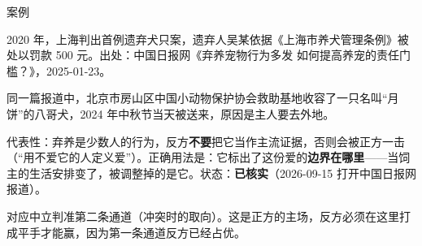 \documentclass[prep,both]{debate}
\begin{document}
\begin{fields}
\begin{evidence}{案例}
\end{evidence}
\begin{bullets}
\item 2020 年，上海判出首例遗弃犬只案，遗弃人吴某依据《上海市养犬管理条例》被处以罚款 500 元。出处：中国日报网《弃养宠物行为多发 如何提高养宠的责任门槛？》，2025-01-23。
\item 同一篇报道中，北京市房山区中国小动物保护协会救助基地收容了一只名叫“月饼”的八哥犬，2024 年中秋节当天被送来，原因是主人要去外地。
\item 代表性：弃养是少数人的行为，反方\textbf{不要}把它当作主流证据，否则会被正方一击（“用不爱它的人定义爱”）。正确用法是：它标出了这份爱的\textbf{边界在哪里}——当饲主的生活安排变了，被调整掉的是它。状态：\textbf{已核实}（2026-09-15 打开中国日报网报道）。
\end{bullets}
\closing[回扣判准]{对应中立判准第二条通道（冲突时的取向）。这是正方的主场，反方必须在这里打成平手才能赢，因为第一条通道反方已经占优。}
\begin{clash}
\end{clash}
\end{fields}
\end{document}
